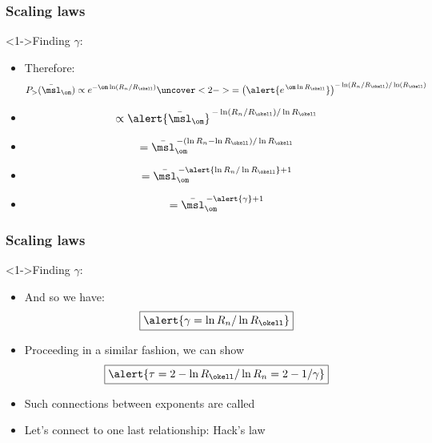 \begin{frame}[label=]
  \frametitle{Scaling laws}

  \begin{block}<1->{Finding $\gamma$:}
    \begin{itemize}
    \item<1-> Therefore:
      $$
      P_> (\bar{\msl}_\om)
      \propto
      e^{-\om \ln (R_n/R_\okell)}
      \uncover<2->{
        =
        \left(
          \alert{e^{\, \om \ln R_\okell}}
        \right)^{-\ln (R_n/R_\okell)/\ln(R_\okell)}
      }
      $$
      \item<3->
        $$
        \propto
        \alert{\bar{\msl}_\om}^{\, -\ln(R_n/R_\okell)/\ln R_\okell}
        $$
      \item<4->
        $$
        =
        \bar{\msl}_\om^{\, -(\ln R_n - \ln R_\okell)/\ln R_\okell}
        $$
      \item<5->
        $$
        =
        \bar{\msl}_\om^{\, - \alert{\ln R_n/\ln R_\okell} + 1}
        $$
      \item<6->
        $$
        =
        \bar{\msl}_\om^{\, -\alert{\gamma} + 1}
        $$
    \end{itemize}
  \end{block}

\end{frame}

\begin{frame}[label=]
  \frametitle{Scaling laws}

  \begin{block}<1->{Finding $\gamma$:}
    \begin{itemize}
    \item<1-> And so we have:
      $$
      \boxed{\alert{\gamma = \ln R_n / \ln R_\okell}}
      $$
    \item<2-> Proceeding in a similar fashion, we can
      show 
      $$
      \boxed{\alert{\tau = 2 - \ln R_\okell / \ln R_n = 2 - 1/\gamma}}
      $$
    \item<3-> Such connections between exponents are 
      called 
    \item<4-> Let's connect to one last relationship: Hack's law
    \end{itemize}
    
  \end{block}

\end{frame}

